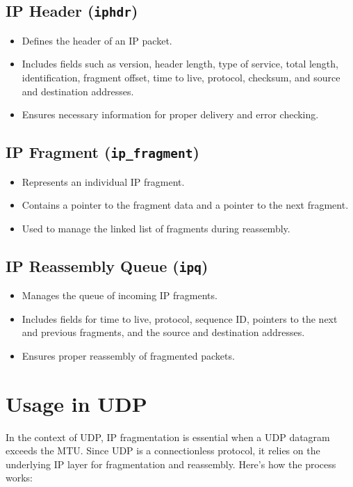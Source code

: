 \subsection{IP Header (\texttt{iphdr})}
\begin{itemize}
    \item Defines the header of an IP packet.
    \item Includes fields such as version, header length, type of service, total length, identification, fragment offset, time to live, protocol, checksum, and source and destination addresses.
    \item Ensures necessary information for proper delivery and error checking.
\end{itemize}

\subsection{IP Fragment (\texttt{ip\_fragment})}
\begin{itemize}
    \item Represents an individual IP fragment.
    \item Contains a pointer to the fragment data and a pointer to the next fragment.
    \item Used to manage the linked list of fragments during reassembly.
\end{itemize}

\subsection{IP Reassembly Queue (\texttt{ipq})}
\begin{itemize}
    \item Manages the queue of incoming IP fragments.
    \item Includes fields for time to live, protocol, sequence ID, pointers to the next and previous fragments, and the source and destination addresses.
    \item Ensures proper reassembly of fragmented packets.
\end{itemize}

\section{Usage in UDP}

In the context of UDP, IP fragmentation is essential when a UDP datagram exceeds the MTU. Since UDP is a connectionless protocol, it relies on the underlying IP layer for fragmentation and reassembly. Here’s how the process works:

